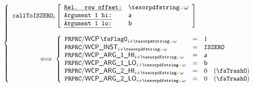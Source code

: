 \[
    \left\{ \begin{array}{l}
        \callToIszero
        {i}{\relof}
        {\col{a}}{\col{b}} \vspace{4mm} \\
        \qquad \qquad \iff
        \left\{ \begin{array}{lcl}
                    \ppWcpFlag       _{i + \relof} & = & 1                \\
                    \ppWcpInst       _{i + \relof} & = & \inst{ISZERO}    \\
                    \ppWcpArgOneHi   _{i + \relof} & = & \col{a}          \\
                    \ppWcpArgOneLo   _{i + \relof} & = & \col{b}          \\
                    \ppWcpArgTwoHi   _{i + \relof} & = & 0 \quad (\trash) \\
                    \ppWcpArgTwoLo   _{i + \relof} & = & 0 \quad (\trash) \\
                \end{array} \right.
    \end{array} \right.
\]

